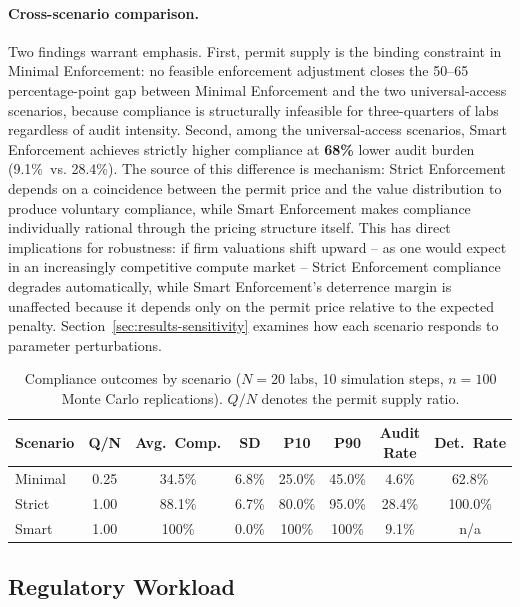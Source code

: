 \paragraph{Cross-scenario comparison.}

Two findings warrant emphasis. First, permit supply is the binding constraint in Minimal Enforcement: no feasible  enforcement adjustment closes the 50--65 percentage-point gap between Minimal Enforcement and the two universal-access scenarios, because compliance is structurally infeasible for three-quarters of labs regardless of audit intensity. Second, among the universal-access scenarios, Smart Enforcement achieves strictly higher compliance at \textbf{68\%} lower audit burden (9.1\%\ vs. 28.4\%). The source of this difference is mechanism: Strict Enforcement depends on a coincidence between the permit price and the value distribution to produce voluntary compliance, while Smart Enforcement makes compliance individually rational through the pricing structure itself. This has direct implications for robustness: if firm valuations shift upward -- as one would expect in an increasingly competitive compute market -- Strict Enforcement compliance degrades automatically, while Smart Enforcement's deterrence margin is unaffected because it depends only on the permit price relative to the expected penalty. Section~\ref{sec:results-sensitivity} examines how each scenario responds to parameter perturbations.

\begin{table}[htbp]
\centering
\caption{Compliance outcomes by scenario ($N = 20$ labs, 10 simulation steps,
$n = 100$ Monte Carlo replications). $Q/N$ denotes the permit supply ratio.}
\label{tab:compliance-summary}
\small
\begin{tabular}{lccccccc}
\toprule
\textbf{Scenario} & \textbf{Q/N} & \textbf{Avg.\ Comp.} & \textbf{SD} &
  \textbf{P10} & \textbf{P90} & \textbf{Audit Rate} & \textbf{Det.\ Rate} \\
\midrule
Minimal & 0.25 & 34.5\% & 6.8\% & 25.0\% & 45.0\% & 4.6\%  & 62.8\% \\
Strict  & 1.00 & 88.1\% & 6.7\% & 80.0\% & 95.0\% & 28.4\% & 100.0\% \\
Smart & 1.00 & 100\%  & 0.0\% & 100\%  & 100\%  &  9.1\% & n/a \\
\bottomrule
\end{tabular}
\end{table}

\subsection{Regulatory Workload}
\label{sec:results-workload}

